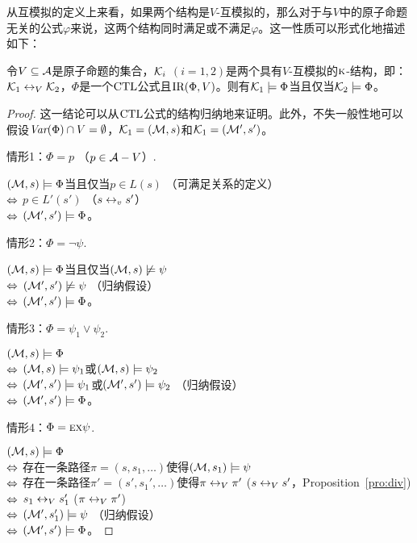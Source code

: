  从互模拟的定义上来看，如果两个结构是$V$-互模拟的，那么对于与$V$中的原子命题无关的公式$\varphi$来说，这两个结构同时满足或不满足$\varphi$。这一性质可以形式化地描述如下：
 
 \begin{theorem}\label{thm:V-bisimulation:EQ}
 	令$V\subseteq {\cal A}$是原子命题的集合，${\cal K}_i$ $(i=1,2)$是两个具有$V$-互模拟的$\textsc{k}$-结构，即：${\cal K}_1 \leftrightarrow_V {\cal K}_2$，$\Phi$是一个$\textrm{CTL}$公式且$\textrm{IR}(\Phi, V)$。则有${\cal K}_1\models \Phi$当且仅当${\cal K}_2\models \Phi$。
 \end{theorem}
\begin{proof}
	这一结论可以从$\textrm{CTL}$公式的结构归纳地来证明。此外，不失一般性地可以假设$\textit{Var}(\Phi) \cap V=\emptyset$，${\cal K}_1=({\cal M},s)$和${\cal K}_1=({\cal M}',s')$。
	
	情形1：$\Phi = p$ （$p\in {\cal A} -V$）.
	
	$({\cal M},s)\models \Phi$当且仅当$p\in L(s)$ \hfill （可满足关系的定义）\\
	$\Leftrightarrow$ $p\in L'(s')$ \hfill （$s \leftrightarrow_v s'$）\\
	$\Leftrightarrow$ $({\cal M}',s') \models \Phi$。
	
	情形2：$\Phi = \neg \psi$.
	
	$({\cal M},s)\models \Phi$当且仅当$({\cal M},s) \not \models \psi$\\
	$\Leftrightarrow$ $({\cal M}',s')\not \models \psi$  \hfill （归纳假设）\\
	$\Leftrightarrow$ $({\cal M}',s') \models \Phi$。
	
	情形3：$\Phi = \psi_1 \vee \psi_2$.
	
	$({\cal M},s)\models \Phi$\\
	$\Leftrightarrow$ $({\cal M},s) \models \psi_1$或$({\cal M},s) \models \psi_2$\\
	$\Leftrightarrow$ $({\cal M}',s')  \models \psi_1$或$({\cal M}',s') \models \psi_2$ \hfill （归纳假设）\\
	$\Leftrightarrow$ $({\cal M}',s') \models \Phi$。
	
	情形4：$\Phi=\textsc{e}\textsc{x}\psi$.
	
	$({\cal M},s)\models \Phi$\\
	$\Leftrightarrow$ 存在一条路径$\pi=(s,s_1,\dots)$使得$({\cal M},s_1)\models \psi$\\
	$\Leftrightarrow$ 存在一条路径$\pi'=(s',s_1',\dots)$使得$\pi \leftrightarrow_V \pi'$ \hfill ($s \leftrightarrow_V s'$，Proposition~\ref{pro:div})\\
	$\Leftrightarrow$ $s_1 \leftrightarrow_V s_1'$ \hfill ($\pi \leftrightarrow_V \pi'$)\\
	$\Leftrightarrow$ $({\cal M}',s_1') \models \psi$   \hfill   （归纳假设）\\
	$\Leftrightarrow$ $({\cal M}',s')\models \Phi$。
	

\end{proof}
